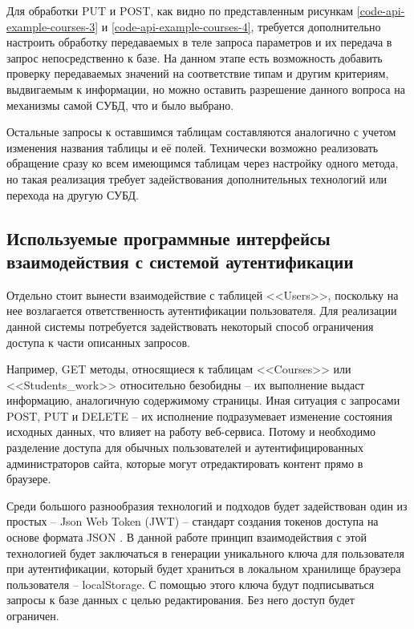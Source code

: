
Для обработки PUT и POST, как видно по представленным рисункам \ref{code-api-example-courses-3} и \ref{code-api-example-courses-4}, требуется дополнительно настроить обработку передаваемых в теле запроса параметров и их передача в запрос непосредственно к базе.
На данном этапе есть возможность добавить проверку передаваемых значений на соответствие типам и другим критериям, выдвигаемым к информации, но можно оставить разрешение данного вопроса на механизмы самой СУБД, что и было выбрано.


Остальные запросы к оставшимся таблицам составляются аналогично с учетом изменения названия таблицы и её полей.
Технически возможно реализовать обращение сразу ко всем имеющимся таблицам через настройку одного метода, но такая реализация требует задействования дополнительных технологий или перехода на другую СУБД.


\subsection{Используемые программные интерфейсы взаимодействия с системой аутентификации}

Отдельно стоит вынести взаимодействие с таблицей <<Users>>, поскольку на нее возлагается ответственность аутентификации пользователя.
Для реализации данной системы потребуется задействовать некоторый способ ограничения доступа к части описанных запросов.

Например, GET методы, относящиеся к таблицам <<Courses>> или <<Students\_work>> относительно безобидны -- их выполнение выдаст информацию, аналогичную содержимому страницы.
Иная ситуация с запросами POST, PUT и DELETE -- их исполнение подразумевает изменение состояния исходных данных, что влияет на работу веб-сервиса.
Потому и необходимо разделение доступа для обычных пользователей и аутентифицированных администраторов сайта, которые могут отредактировать контент прямо в браузере.

Среди большого разнообразия технологий и подходов будет задействован один из простых -- Json Web Token (JWT) \cite{jwt} -- стандарт создания токенов доступа на основе формата JSON \cite{wiki-json}. 
В данной работе принцип взаимодействия с этой технологией будет заключаться в генерации уникального ключа для пользователя при аутентификации, который будет храниться в локальном хранилище браузера пользователя -- localStorage.
С помощью этого ключа будут подписываться запросы к базе данных с целью редактирования.
Без него доступ будет ограничен.

